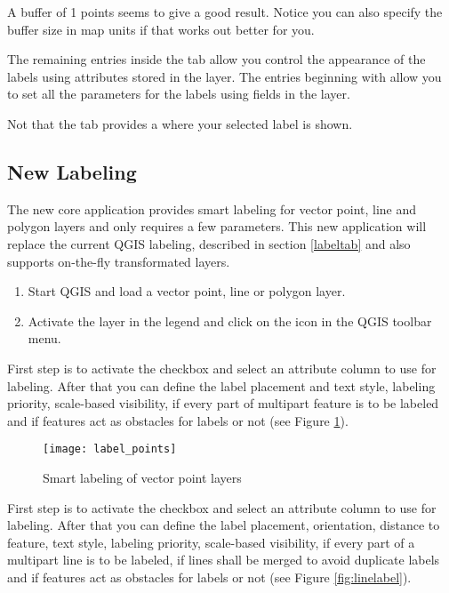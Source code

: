 A buffer of 1 points seems to give a good result.
Notice you can also specify the buffer size in map units if that works out
better for you.

The remaining entries inside the  tab allow you control the appearance of the
labels using attributes stored in the layer. The entries beginning with  allow you to
set all the parameters for the labels using fields in the layer.

Not that the  tab provides a  where your
selected label is shown.

\subsection{New Labeling}\label{newlabel}

The new  core application provides smart labeling
for vector point, line and polygon layers and only requires a few parameters.
This new application will replace the current QGIS labeling, described in section
\ref{labeltab} and also supports on-the-fly transformated layers.


\begin{enumerate}
  \item Start QGIS and load a vector point, line or polygon layer.
  \item Activate the layer in the legend and click on the
   icon in the QGIS toolbar menu.
\end{enumerate}


First step is to activate the  checkbox and select an attribute
column to use for labeling. After that you can define the label placement and text style,
labeling priority, scale-based visibility, if every part of multipart feature is to be
labeled and if features act as obstacles for labels or not (see
Figure \ref{fig:pointlabel}).

\begin{figure}[ht]
\centering
   \texttt{[image: label\_points]}
   \caption{Smart labeling of vector point layers \nixcaption}\label{fig:pointlabel}
\end{figure}


First step is to activate the  checkbox and select an attribute
column to use for labeling. After that you can define the label placement, orientation,
distance to feature, text style, labeling priority, scale-based visibility, if every part
of a multipart line is to be labeled, if lines shall be merged to avoid duplicate labels
and if features act as obstacles for labels or not (see Figure \ref{fig:linelabel}).

